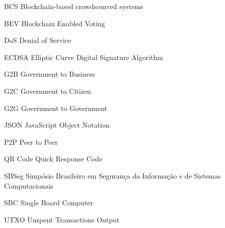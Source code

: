 
\begin{siglas}
  \item[BCS] Blockchain-based crowdsourced systems
  \item[BEV] Blockchain Enabled Voting
  \item[DoS] Denial of Service
  \item[ECDSA] Elliptic Curve Digital Signature Algorithm
  \item[G2B] Government to Business
  \item[G2C] Government to Citizen
  \item[G2G] Government to Government
  \item[JSON] JavaScript Object Notation
  \item[P2P] Peer to Peer
  \item[QR Code] Quick Response Code
  \item[SBSeg] Simpósio Brasileiro em Segurança da Informação e de Sistemas Computacionais
  \item[SBC] Single Board Computer
  \item[UTXO] Unspent Transactions Output
  
\end{siglas}